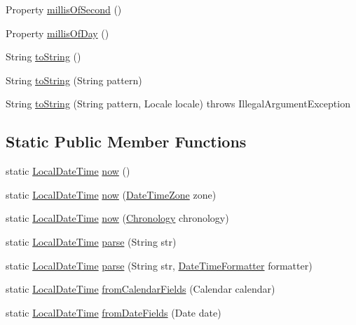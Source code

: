 \begin{DoxyCompactItemize}
Property \hyperlink{classorg_1_1joda_1_1time_1_1_local_date_time_a41c1cc944cfbfc3d44361d1066d288ef}{millis\-Of\-Second} ()
\item 
Property \hyperlink{classorg_1_1joda_1_1time_1_1_local_date_time_ad1504a2e907b656a05a4877bcdb4b7d0}{millis\-Of\-Day} ()
\item 
String \hyperlink{classorg_1_1joda_1_1time_1_1_local_date_time_ad701757354dfb97ac542d12053d33a1f}{to\-String} ()
\item 
String \hyperlink{classorg_1_1joda_1_1time_1_1_local_date_time_a1b65e39cc399c3fbf7b0f432f54cf202}{to\-String} (String pattern)
\item 
String \hyperlink{classorg_1_1joda_1_1time_1_1_local_date_time_af7d49e5a9367013f7a8e121b5d42de07}{to\-String} (String pattern, Locale locale)  throws Illegal\-Argument\-Exception 
\end{DoxyCompactItemize}
\subsection*{Static Public Member Functions}
\begin{DoxyCompactItemize}
\item 
static \hyperlink{classorg_1_1joda_1_1time_1_1_local_date_time}{Local\-Date\-Time} \hyperlink{classorg_1_1joda_1_1time_1_1_local_date_time_a7679d0d13fb7bad50e0c36ab751285b4}{now} ()
\item 
static \hyperlink{classorg_1_1joda_1_1time_1_1_local_date_time}{Local\-Date\-Time} \hyperlink{classorg_1_1joda_1_1time_1_1_local_date_time_afe5912fd3b305258b7703c9abaf07087}{now} (\hyperlink{classorg_1_1joda_1_1time_1_1_date_time_zone}{Date\-Time\-Zone} zone)
\item 
static \hyperlink{classorg_1_1joda_1_1time_1_1_local_date_time}{Local\-Date\-Time} \hyperlink{classorg_1_1joda_1_1time_1_1_local_date_time_af96169cf1f869ab327682a3d11c3c733}{now} (\hyperlink{classorg_1_1joda_1_1time_1_1_chronology}{Chronology} chronology)
\item 
static \hyperlink{classorg_1_1joda_1_1time_1_1_local_date_time}{Local\-Date\-Time} \hyperlink{classorg_1_1joda_1_1time_1_1_local_date_time_af5676a580437ae00b7dbafe50931493e}{parse} (String str)
\item 
static \hyperlink{classorg_1_1joda_1_1time_1_1_local_date_time}{Local\-Date\-Time} \hyperlink{classorg_1_1joda_1_1time_1_1_local_date_time_a085dc743663e092c628ccb5770bbfe4f}{parse} (String str, \hyperlink{classorg_1_1joda_1_1time_1_1format_1_1_date_time_formatter}{Date\-Time\-Formatter} formatter)
\item 
static \hyperlink{classorg_1_1joda_1_1time_1_1_local_date_time}{Local\-Date\-Time} \hyperlink{classorg_1_1joda_1_1time_1_1_local_date_time_af2ae5819017ca875fad2d8928fccf8b9}{from\-Calendar\-Fields} (Calendar calendar)
\item 
static \hyperlink{classorg_1_1joda_1_1time_1_1_local_date_time}{Local\-Date\-Time} \hyperlink{classorg_1_1joda_1_1time_1_1_local_date_time_ac8956e850181b8af301f885c4f1c8896}{from\-Date\-Fields} (Date date)
\end{DoxyCompactItemize}
